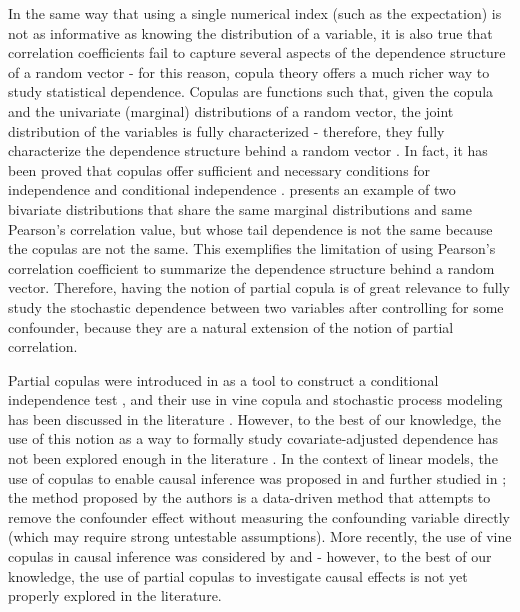 \documentclass[
]{article}
\begin{document}
In the same way that using a single numerical index (such as the
expectation) is not as informative as knowing the distribution of a
variable, it is also true that correlation coefficients fail to capture
several aspects of the dependence structure of a random vector - for
this reason, copula theory offers a much richer way to study statistical
dependence. Copulas are functions such that, given the copula and the
univariate (marginal) distributions of a random vector, the joint
distribution of the variables is fully characterized - therefore, they
fully characterize the dependence structure behind a random vector
\citep{nelsen2006, joe2014}. In fact, it has been proved that copulas
offer sufficient and necessary conditions for independence
\citep[Theorem 2.4.2 in][]{nelsen2006} and conditional independence
\citep[Theorem 1 in][]{gonzalezlopez2024}. \citet{embrechts2002}
presents an example of two bivariate distributions that share the same
marginal distributions and same Pearson's correlation value, but whose
tail dependence is not the same because the copulas are not the same.
This exemplifies the limitation of using Pearson's correlation
coefficient to summarize the dependence structure behind a random
vector. Therefore, having the notion of partial copula is of great
relevance to fully study the stochastic dependence between two variables
after controlling for some confounder, because they are a natural
extension of the notion of partial correlation.

Partial copulas were introduced in \citet{bergsma2004} as a tool to
construct a conditional independence test \citetext{\citealp[which has
also been explored
in][]{bergsma2011}; \citealp{patra2016}; \citealp[and][]{petersen2021}},
and their use in vine copula and stochastic process modeling has been
discussed in the literature \citep{bladt2022, bauer2016, spanhel2019}.
However, to the best of our knowledge, the use of this notion as a way
to formally study covariate-adjusted dependence has not been explored
enough in the literature \citep[despite the existence of some references
exploring related matters, see][ and \citet{spanhel2016}]{gijbels2015}.
In the context of linear models, the use of copulas to enable causal
inference was proposed in \citet{park2012} and further studied in
\citet{falkenstrom2023}; the method proposed by the authors is a
data-driven method that attempts to remove the confounder effect without
measuring the confounding variable directly (which may require strong
untestable assumptions). More recently, the use of vine copulas in
causal inference was considered by \citet{justus2024} and
\citet{czado2025} - however, to the best of our knowledge, the use of
partial copulas to investigate causal effects is not yet properly
explored in the literature.
\end{document}

